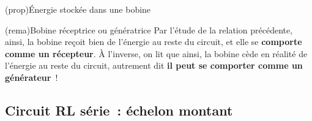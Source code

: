 \documentclass[../../main/main.tex]{subfiles}
\begin{document}
\begin{tcb}[label=prop:El](prop){Énergie stockée dans une bobine}
	\psw{
		\[
			\boxed{\Ec_L(t) = \frac{1}{2}L i{}^2(t)}
		\]
	}
	\vspace{-10pt}
\end{tcb}
\begin{tcb}[label=rema:genrec, sidebyside](rema){Bobine réceptrice ou
			génératrice}
	Par l'étude de la relation précédente,
	ainsi, la bobine reçoit bien de l'énergie au reste du circuit, et elle se
	\textbf{comporte comme un récepteur}.
	\tcblower
	À l'inverse, on lit que
	ainsi, la bobine cède en réalité de l'énergie au reste du circuit,
	autrement dit \textbf{il peut se comporter comme un générateur}~!
\end{tcb}

\subsection{Circuit RL série~: échelon montant}
\end{document}
